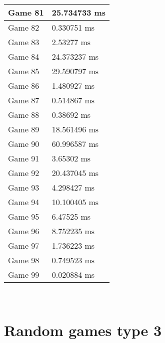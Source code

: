 \begin{multicols}{2}
\begin{tabular}{|l|l|}
	Game 81 & 25.734733 ms \\ \hline
	Game 82 & 0.330751 ms \\ \hline
	Game 83 & 2.53277 ms \\ \hline
	Game 84 & 24.373237 ms \\ \hline
	Game 85 & 29.590797 ms \\ \hline
	Game 86 & 1.480927 ms \\ \hline
	Game 87 & 0.514867 ms \\ \hline
	Game 88 & 0.38692 ms \\ \hline
	Game 89 & 18.561496 ms \\ \hline
	Game 90 & 60.996587 ms \\ \hline
	Game 91 & 3.65302 ms \\ \hline
	Game 92 & 20.437045 ms \\ \hline
	Game 93 & 4.298427 ms \\ \hline
	Game 94 & 10.100405 ms \\ \hline
	Game 95 & 6.47525 ms \\ \hline
	Game 96 & 8.752235 ms \\ \hline
	Game 97 & 1.736223 ms \\ \hline
	Game 98 & 0.749523 ms \\ \hline
	Game 99 & 0.020884 ms \\ \hline
\end{tabular}\\
\end{multicols}\pagebreak\section{Random games type 3}

